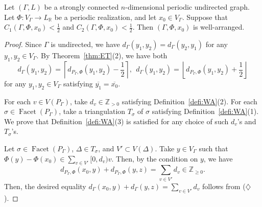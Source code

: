 \documentclass[ALCO,published]{cedram}
\theoremstyle{remark}
\begin{document}
\begin{prop}\label{prop:refWA}
Let $(\Gamma , L)$ be a strongly connected $n$-dimensional periodic undirected graph. 
Let $\Phi : V_{\Gamma} \to L_{\mathbb{R}}$ be a periodic realization, and let $x_0 \in V_{\Gamma}$. 
Suppose that $C_1(\Gamma, \Phi, x_0) < \frac{1}{2}$ and $C_2(\Gamma, \Phi, x_0) < \frac{1}{2}$. 
Then $(\Gamma, \Phi, x_0)$ is well-arranged. 
\end{prop}
\begin{proof}
Since $\Gamma$ is undirected, we have $d_{\Gamma}(y_1,y_2) = d_{\Gamma}(y_2,y_1)$ for any $y_1, y_2 \in V_{\Gamma}$. 
By Theorem~\ref{thm:ET}(2), we have both
\[
d_{\Gamma}(y_1, y_2) 
= \left \lceil d_{P_{\Gamma}, \Phi}(y_1, y_2) - \frac{1}{2} \right \rceil, \ \ 
d_{\Gamma}(y_1, y_2) 
= \left \lfloor d_{P_{\Gamma}, \Phi}(y_1, y_2) + \frac{1}{2} \right \rfloor
\tag{$\diamondsuit$}
\]
for any $y_1, y_2 \in V_{\Gamma}$ satisfying $\overline{y_1} = \overline{x_0}$. 

For each $v \in V(P_{\Gamma})$, take $d_v \in \mathbb{Z}_{>0}$ satisfying Definition~\ref{defi:WA}(2). 
For each $\sigma \in \operatorname{Facet}(P_{\Gamma})$, take a triangulation $T_{\sigma}$ of $\sigma$ satisfying Definition~\ref{defi:WA}(1). 
We prove that Definition~\ref{defi:WA}(3) is satisfied for any choice of such $d_v$'s and $T_{\sigma}$'s. 

Let $\sigma \in \operatorname{Facet}(P_{\Gamma})$, $\Delta \in T_{\sigma}$, and $V' \subset V(\Delta)$. Take $y \in V_{\Gamma}$ such that $\Phi(y) - \Phi(x_0) \in \sum _{v \in V'} [0,d_v) v$. 
Then, by the condition on $y$, we have 
\[
d_{P_{\Gamma}, \Phi}(x_0, y) + d_{P_{\Gamma}, \Phi}(y, z) 
= \sum _{v \in V'} d_v \in \mathbb{Z}_{\ge 0}. 
\]
Then, the desired equality $d_{\Gamma}(x_0, y) + d_{\Gamma}(y,z) = \sum _{v \in V'} d_v$ 
follows from ($\diamondsuit$). 
\end{proof}
\end{document}
